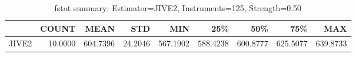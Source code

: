 \begin{table}[ht]
\centering
\caption{fstat summary: Estimator=JIVE2, Instruments=125, Strength=0.50}
\begin{tabular}{lrrrrrrrr}
\toprule
 & COUNT & MEAN & STD & MIN & 25\% & 50\% & 75\% & MAX \\
\midrule
JIVE2 & 10.0000 & 604.7396 & 24.2046 & 567.1902 & 588.4238 & 600.8777 & 625.5077 & 639.8733 \\
\bottomrule
\end{tabular}
\end{table}
